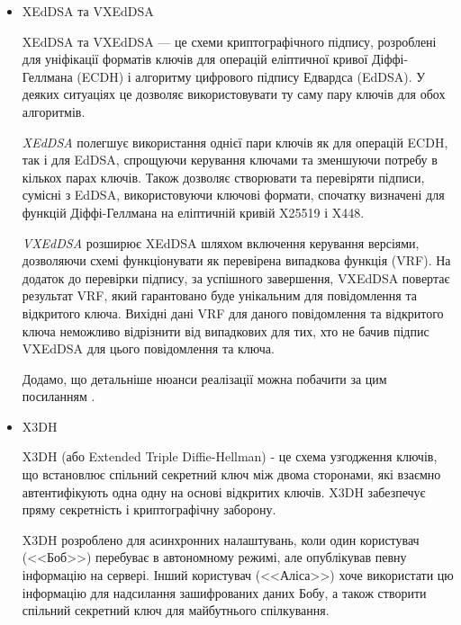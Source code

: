 \begin{itemize}
    \item XEdDSA та VXEdDSA

        XEdDSA та VXEdDSA — це схеми криптографічного підпису, розроблені для уніфікації форматів ключів для операцій еліптичної кривої Діффі-Геллмана (ECDH) і алгоритму цифрового підпису Едвардса (EdDSA). У деяких ситуаціях це дозволяє використовувати ту саму пару ключів для обох алгоритмів.

        \textit{XEdDSA} полегшує використання однієї пари ключів як для операцій ECDH, так і для EdDSA, спрощуючи керування ключами та зменшуючи потребу в кількох парах ключів. Також дозволяє створювати та перевіряти підписи, сумісні з EdDSA, використовуючи ключові формати, спочатку визначені для функцій Діффі-Геллмана на еліптичній кривій X25519 і X448.

        \textit{VXEdDSA} розширює XEdDSA шляхом включення керування версіями, дозволяючи схемі функціонувати як перевірена випадкова функція (VRF). На додаток до перевірки підпису, за успішного завершення, VXEdDSA повертає результат VRF, який гарантовано буде унікальним для повідомлення та відкритого ключа. Вихідні дані VRF для даного повідомлення та відкритого ключа неможливо відрізнити від випадкових для тих, хто не бачив підпис VXEdDSA для цього повідомлення та ключа.

        Додамо, що детальніше нюанси реалізації можна побачити за цим посиланням \cite{perrin2016xeddsa}.
        
    \item X3DH 

        X3DH (або Extended Triple Diffie-Hellman) - це схема узгодження ключів, що встановлює спільний секретний ключ між двома сторонами, які взаємно автентифікують одна одну на основі відкритих ключів. X3DH забезпечує пряму секретність і криптографічну заборону.

        X3DH розроблено для асинхронних налаштувань, коли один користувач (<<Боб>>) перебуває в автономному режимі, але опублікував певну інформацію на сервері. Інший користувач (<<Аліса>>) хоче використати цю інформацію для надсилання зашифрованих даних Бобу, а також створити спільний секретний ключ для майбутнього спілкування.
        

\end{itemize}
